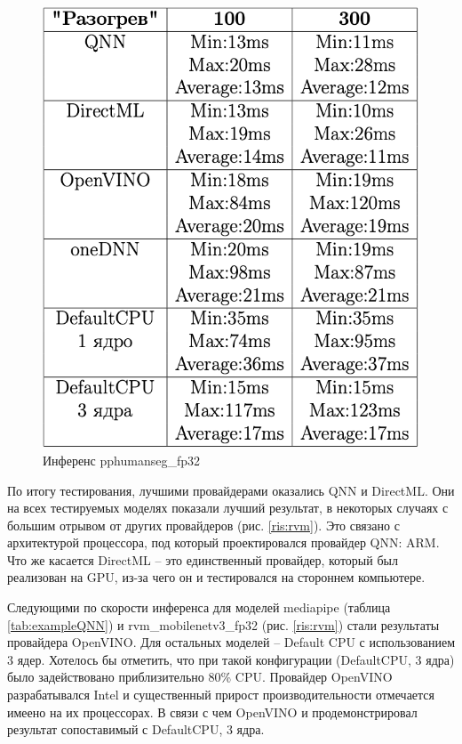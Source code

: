 \documentclass[a4paper,14pt]{extreport}
\begin{document}
\begin{figure}[!h]
\begin{center}
\begin{minipage}[h]{0.4\linewidth}
                    \includegraphics[width=1\linewidth]{images-results/pphumaseg.png}
                    \caption{Инференс pphumanseg\_fp32}
                    \label{ris:pphumanseg}
                \end{minipage}
            \end{center}
        \end{figure}

        По итогу тестирования, лучшими провайдерами оказались QNN и DirectML. Они на всех тестируемых моделях показали лучший результат, в некоторых случаях с большим отрывом от других провайдеров (рис. \ref{ris:rvm}). Это связано с архитектурой процессора, под который проектировался провайдер QNN: ARM. Что же касается DirectML -- это единственный провайдер, который был реализован на GPU, из-за чего он и тестировался на стороннем компьютере.
        
        Следующими по скорости инференса для моделей mediapipe (таблица \ref{tab:exampleQNN}) и  rvm\_mobilenetv3\_fp32 (рис. \ref{ris:rvm}) стали результаты провайдера OpenVINO. Для остальных моделей -- Default CPU с использованием 3 ядер. Хотелось бы отметить, что при такой конфигурации (DefaultCPU, 3 ядра) было задействовано приблизительно 80\% CPU. Провайдер OpenVINO разрабатывался Intel и существенный прирост производительности отмечается имеено на их процессорах. В связи с чем OpenVINO и продемонстрировал результат сопоставимый с DefaultCPU, 3 ядра. 
\end{document}
